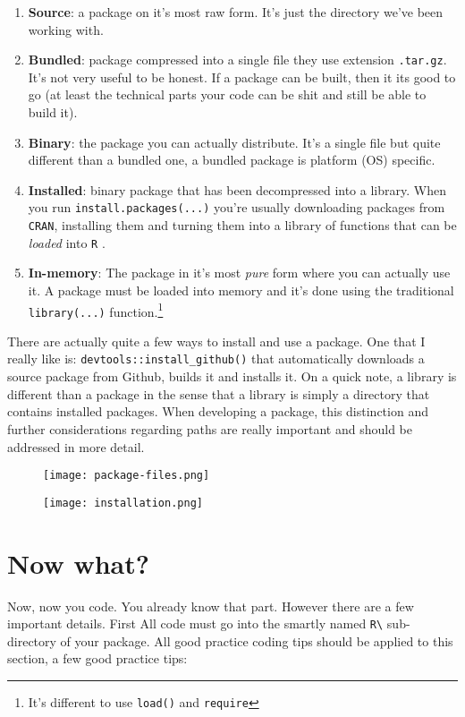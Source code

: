 \documentclass[pdftex,11pt,a4paper]{article}
\newcommand{\R}{\texttt{R} }
\begin{document}
\begin{enumerate}
	\item \textbf{Source}: a package on it's most raw form. It's just the directory we've been working with.
	\item \textbf{Bundled}: package compressed into a single file they use extension \verb|.tar.gz|. It's not very useful to be honest. If a package can be built, then it its good to go (at least the technical parts your code can be shit and still be able to build it).
	\item \textbf{Binary}: the package you can actually distribute. It's a single file but quite different than a bundled one, a bundled package is platform (OS) specific.
	\item \textbf{Installed}: binary package that has been decompressed into a library. When you run \verb|install.packages(...)| you're usually downloading packages from \verb|CRAN|, installing them and turning them into a library of functions that can be \textit{loaded} into \R. 
	\item \textbf{In-memory}: The package in it's most \textit{pure} form where you can actually use it. A package must be loaded into memory and it's done using the traditional \verb|library(...)|  function.\footnote{It's different to use \texttt{load()} and \texttt{require}}
\end{enumerate}

There are actually quite a few ways to install and use a package. One that I really like is: \verb|devtools::install_github()| that automatically downloads a source package from Github, builds it and installs it. On a quick note, a library is different than a package in the sense that a library is simply a directory that contains installed packages. When developing a package, this distinction and further considerations regarding paths are really important and should be addressed in more detail. 

\begin{figure}[h]
	\centering
	\texttt{[image: package-files.png]}
\end{figure}

\begin{figure}[h]
	\centering
	\texttt{[image: installation.png]}
\end{figure}

\section*{Now what?}
Now, now you code. You already know that part. However there are a few important details. First All code must go into the smartly named \verb|R\| sub-directory of your package. All good practice coding tips should be applied to this section, a few good practice tips:
\end{document}
